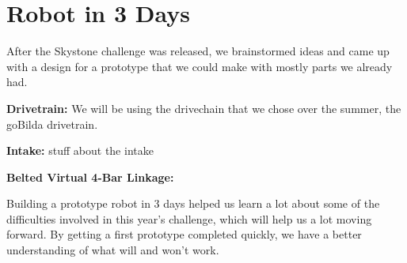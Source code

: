 
\section{Robot in 3 Days}

After the Skystone challenge was released, we brainstormed ideas and came up with a design for a prototype that we could make with mostly parts we already had.

\par \textbf{Drivetrain:} We will be using the drivechain that we chose over the summer, the goBilda drivetrain.

\par \textbf{Intake:} stuff about the intake

\par \textbf{Belted Virtual 4-Bar Linkage:} 

\par Building a prototype robot in 3 days helped us learn a lot about some of the difficulties involved in this year's challenge, which will help us a lot moving forward. By getting a first prototype completed quickly, we have a better understanding of what will and won't work.
\newpage

